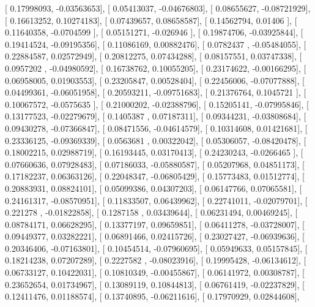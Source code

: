 \documentclass{article}
\begin{document}
       [ 0.17998093, -0.03563653],
       [ 0.05413037, -0.04676803],
       [ 0.08655627, -0.08721929],
       [ 0.16613252,  0.10274183],
       [ 0.07439657,  0.08658587],
       [ 0.14562794,  0.01406   ],
       [ 0.11640358, -0.0704599 ],
       [ 0.05151271, -0.026946  ],
       [ 0.19874706, -0.03925844],
       [ 0.19414524, -0.09195356],
       [ 0.11086169,  0.00882476],
       [ 0.0782437 , -0.05484055],
       [ 0.22884587,  0.02572949],
       [ 0.20812275,  0.07434288],
       [ 0.08157551,  0.03747338],
       [ 0.0957202 , -0.04980592],
       [ 0.16738762,  0.10055205],
       [ 0.23174622, -0.00166295],
       [ 0.06958005,  0.01903553],
       [ 0.23205847,  0.00528404],
       [ 0.22456006, -0.07077888],
       [ 0.04499361, -0.06051958],
       [ 0.20593211, -0.09751683],
       [ 0.21376764,  0.1045721 ],
       [ 0.10067572, -0.0575635 ],
       [ 0.21000202, -0.02388796],
       [ 0.15205141, -0.07995846],
       [ 0.13177523, -0.02279679],
       [ 0.1405387 ,  0.07187311],
       [ 0.09344231, -0.03808684],
       [ 0.09430278, -0.07366847],
       [ 0.08471556, -0.04614579],
       [ 0.10314608,  0.01421681],
       [ 0.23336125, -0.09369339],
       [ 0.0563681 ,  0.00322042],
       [ 0.05306057, -0.08420478],
       [ 0.18002215,  0.02988719],
       [ 0.16193445,  0.03170413],
       [ 0.24230243, -0.0266465 ],
       [ 0.07660636,  0.07928483],
       [ 0.07186033, -0.05880587],
       [ 0.05207968,  0.04851173],
       [ 0.17182237,  0.06363126],
       [ 0.22048347, -0.06805429],
       [ 0.15773483,  0.01512774],
       [ 0.20883931,  0.08824101],
       [ 0.05099386,  0.04307203],
       [ 0.06147766,  0.07065581],
       [ 0.24161317, -0.08570951],
       [ 0.11833507,  0.06439962],
       [ 0.22741011, -0.02079701],
       [ 0.221278  , -0.01822858],
       [ 0.1287158 ,  0.03439644],
       [ 0.06231494,  0.00469245],
       [ 0.08784171,  0.06628295],
       [ 0.13377197,  0.09659851],
       [ 0.06411278, -0.03728007],
       [ 0.09449377,  0.03282221],
       [ 0.06891466,  0.02415726],
       [ 0.23027427, -0.06939636],
       [ 0.20346406, -0.07163801],
       [ 0.10454514, -0.07960695],
       [ 0.05949633,  0.05157845],
       [ 0.18214238,  0.07207289],
       [ 0.2227582 , -0.08023916],
       [ 0.19995428, -0.06134612],
       [ 0.06733127,  0.10422031],
       [ 0.10810349, -0.00455867],
       [ 0.06141972,  0.00308787],
       [ 0.23652654,  0.01734967],
       [ 0.13089119,  0.10844813],
       [ 0.06761419, -0.02237829],
       [ 0.12411476,  0.01188574],
       [ 0.13740895, -0.06211616],
       [ 0.17970929,  0.02844608],
\end{document}
